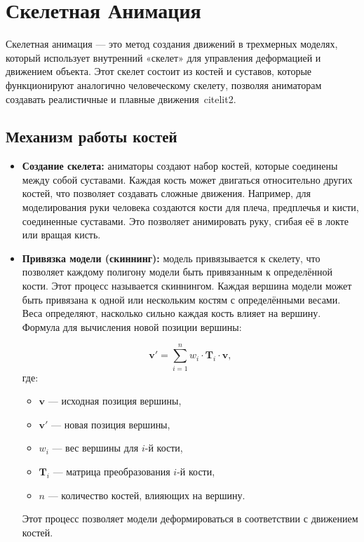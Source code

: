 \section{Скелетная Анимация}

Скелетная анимация — это метод создания движений в трехмерных моделях, который использует внутренний «скелет» для управления деформацией и движением объекта. Этот скелет состоит из костей и суставов, которые функционируют аналогично человеческому скелету, позволяя аниматорам создавать реалистичные и плавные движения~cite{lit2}.

\subsection{Механизм работы костей}

\begin{itemize}
    \item \textbf{Создание скелета:} аниматоры создают набор костей, которые соединены между собой суставами. Каждая кость может двигаться относительно других костей, что позволяет создавать сложные движения. Например, для моделирования руки человека создаются кости для плеча, предплечья и кисти, соединенные суставами. Это позволяет анимировать руку, сгибая её в локте или вращая кисть.
    
    \item \textbf{Привязка модели (скиннинг):} модель привязывается к скелету, что позволяет каждому полигону модели быть привязанным к определённой кости. Этот процесс называется скиннингом. Каждая вершина модели может быть привязана к одной или нескольким костям с определёнными весами. Веса определяют, насколько сильно каждая кость влияет на вершину. 
    Формула для вычисления новой позиции вершины:
    
\[
\mathbf{v}' = \sum_{i=1}^{n} w_i \cdot \mathbf{T}_i \cdot \mathbf{v},
\]
где:
\begin{itemize}
    \item \(\mathbf{v}\) — исходная позиция вершины,
    \item \(\mathbf{v}'\) — новая позиция вершины,
    \item \(w_i\) — вес вершины для \(i\)-й кости,
    \item \(\mathbf{T}_i\) — матрица преобразования \(i\)-й кости,
    \item \(n\) — количество костей, влияющих на вершину.
\end{itemize}
    Этот процесс позволяет модели деформироваться в соответствии с движением костей.
    

\end{itemize}
